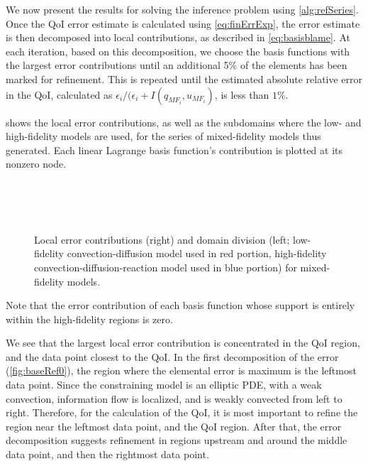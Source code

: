 We now present the results for solving the inference problem using \cref{alg:refSeries}. Once the QoI error estimate is calculated using \ref{eq:finErrExp}, the error estimate is then decomposed into local contributions, as described in \cref{eq:basisblame}. At each iteration, based on this decomposition, we choose the basis functions with the largest error contributions until an additional 5\% of the elements has been marked for refinement. This is repeated until the estimated absolute relative error in the QoI, calculated as $\epsilon_i/(\epsilon_i+I(q_{MF_i},u_{MF_i})$, is less than $1\%$.

 shows the local error contributions, as well as the subdomains where the low- and high-fidelity models are used, for the series of mixed-fidelity models thus generated. Each linear Lagrange basis function's contribution is plotted at its nonzero node.
%
\begin{figure}[htbp]
\centering
{} \\
 \\
 \\
\caption{Local error contributions (right) and domain division (left; low-fidelity convection-diffusion model used in red portion, high-fidelity convection-diffusion-reaction model used in blue portion) for mixed-fidelity models.}
\label{fig:baseRef}
\end{figure}
%
Note that the error contribution of each basis function whose support is entirely within the high-fidelity regions is zero.

We see that the largest local error contribution is concentrated in the QoI region, and the data point closest to the QoI. In the first decomposition of the error (\cref{fig:baseRef0}), the region where the elemental error is maximum is the leftmost data point. Since the constraining model is an elliptic PDE, with a weak convection, information flow is localized, and is weakly convected from left to right. Therefore, for the calculation of the QoI, it is most important to refine the region near the leftmost data point, and the QoI region. After that, the error decomposition suggests refinement in regions upstream and around the middle data point, and then the rightmost data point.

